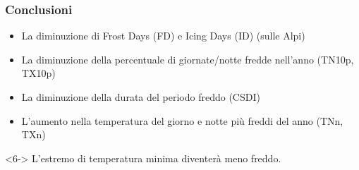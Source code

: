 \begin{frame}[t]
\begin{columns}
     \vspace*{-3ex}
\end{columns}
        
\end{frame} 

\begin{frame}	
    \frametitle{Conclusioni}
    \begin{itemize}	
    \item<1-> La diminuzione di Frost Days (FD) e Icing Days (ID) (sulle Alpi)
	\item<2-> La diminuzione della percentuale di giornate/notte fredde nell'anno (TN10p, TX10p) 
	\item<3-> La diminuzione della durata del periodo freddo (CSDI)
	\item<4-> L'aumento nella temperatura del giorno e notte più freddi del anno (TNn, TXn)
	\end{itemize}

\begin{alertblock}<6->{}
L'estremo di temperatura minima diventerà meno freddo. 
\end{alertblock}	
\end{frame}	

